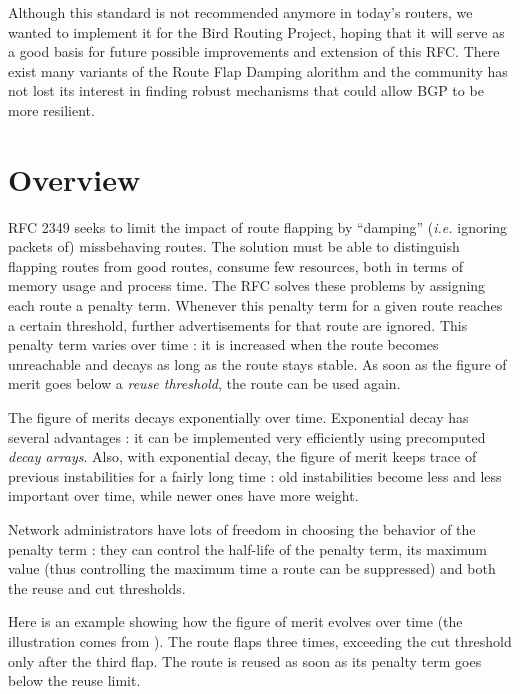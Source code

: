 \documentclass[a4paper,english]{IEEEtran}
\begin{document}
Although this standard is not recommended anymore\cite{ripe recommendations}
in today's routers, we wanted to implement it for the Bird Routing
Project\cite{bird}, hoping that it will serve as a good basis for
future possible improvements and extension of this RFC. There exist
many variants of the Route Flap Damping alorithm and the community
has not lost its interest in finding robust mechanisms that could
allow BGP to be more resilient. 

\section{Overview}

RFC 2349 seeks to limit the impact of route flapping by ``damping'' (\textit{i.e.} ignoring packets of) missbehaving routes.
The solution must be able to distinguish flapping routes from good routes, consume few resources, both in terms of memory usage and process time.
The RFC solves these problems by assigning each route a penalty term.
Whenever this penalty term for a given route reaches a certain threshold, further advertisements for that route are ignored.
This penalty term varies over time : it is increased when the route becomes unreachable and decays as long as the route stays stable.
As soon as the figure of merit goes below a \textit{reuse threshold}, the route can be used again.

The figure of merits decays exponentially over time.
Exponential decay has several advantages : it can be implemented very efficiently using precomputed \textit{decay arrays}.
Also, with exponential decay, the figure of merit keeps trace of previous instabilities for a fairly long time : old instabilities become less and less important over time, while newer ones have more weight.

Network administrators have lots of freedom in choosing the behavior of the penalty term : they can control the half-life of the penalty term, its maximum value (thus controlling the maximum time a route can be suppressed) and both the reuse and cut thresholds.

Here is an example showing how the figure of merit evolves over time (the illustration comes from \cite{damping-pic}).
The route flaps three times, exceeding the cut threshold only after the third flap.
The route is reused as soon as its penalty term goes below the reuse limit.
\end{document}
